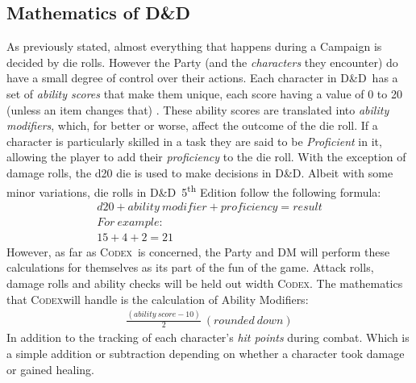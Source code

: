 \documentclass[progress]{cmpreport}
\newcommand{\dnd}{D\&D}
\newcommand{\Codex}{\textsc{Codex}}
\begin{document}
	\subsection{Mathematics of \dnd}
	As previously stated, almost everything that happens during a Campaign is decided by die rolls. However the Party (and the \emph{characters} they encounter) do have a small degree of control over their actions. Each character in \dnd \ has a set of \emph{ability scores} that make them unique, each score having a value of 0 to 20 (unless an item changes that) \citep{PlayerHandbook}. These ability scores are translated into \emph{ability modifiers}, which, for better or worse, affect the outcome of the die roll. If a character is particularly skilled in a task they are said to be \emph{Proficient} in it, allowing the player to add their \emph{proficiency} to the die roll. With the exception of damage rolls, the d20 die is used to make decisions in \dnd. Albeit with some minor variations, die rolls in \dnd \ 5\textsuperscript{th} Edition follow the following formula:
	\begin{gather*}
	d20 + ability \ modifier + proficiency = result \\
	For \ example: \\
	15 + 4 + 2 = 21
	\end{gather*}
	However, as far as \Codex \ is concerned, the Party and DM will perform these calculations for themselves as its part of the fun of the game. Attack rolls, damage rolls and ability checks will be held out width \Codex. The mathematics that \Codex will handle is the calculation of Ability Modifiers:
	\begin{gather*}
	\frac{(ability \ score - 10)}{2} \ (rounded \ down)
	\end{gather*}
	In addition to the tracking of each character's \emph{hit points} during combat. Which is a simple addition or subtraction depending on whether a character took damage or gained healing.	
	
\end{document}
